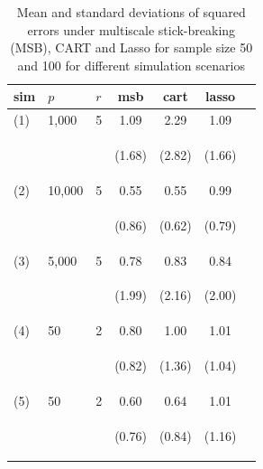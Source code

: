 \documentclass{article}
\begin{document}
\begin{table}[t]
\caption{Mean and standard deviations of squared errors under multiscale stick-breaking (MSB), CART and Lasso for sample size 50 and 100 for different simulation scenarios}\label{table1}
\label{table1}
\vskip 0.15in
\begin{center}
\begin{small}
\begin{sc}
\begin{tabular}{lllcccc}
\hline
\abovespace\belowspace
 sim&$p$&$r$& msb&cart&lasso\\
\hline
\abovespace
\belowspace
(1)  & 1,000 &5& 1.09&2.29& 1.09 \\
&& & \begin{scriptsize} (1.68)\end{scriptsize} & \begin{scriptsize} (2.82)\end{scriptsize}& \begin{scriptsize} (1.66)\end{scriptsize}\\
(2)&10,000& 5&0.55& 0.55 &0.99\\ 
&&& \begin{scriptsize} (0.86)\end{scriptsize} & \begin{scriptsize} (0.62)\end{scriptsize} & \begin{scriptsize} (0.79)\end{scriptsize}\\
(3)&5,000 &5&  0.78 &0.83 & 0.84\\
&&&   \begin{scriptsize} (1.99)\end{scriptsize} & \begin{scriptsize} (2.16)\end{scriptsize} & \begin{scriptsize} (2.00)\end{scriptsize}\\
(4)&50&2& 0.80&1.00&1.01 \\
&&& \begin{scriptsize} (0.82)\end{scriptsize}& \begin{scriptsize} (1.36)\end{scriptsize}& \begin{scriptsize} (1.04)\end{scriptsize}\\
(5) &50&2 & 0.60&0.64 &1.01\\  
&&& \begin{scriptsize} (0.76)\end{scriptsize}& \begin{scriptsize} (0.84)\end{scriptsize}& \begin{scriptsize} (1.16)\end{scriptsize}\\
\hline
\end{tabular}
\end{sc}
\end{small}
\end{center}
\vskip -0.1in
\end{table}
\end{document}
